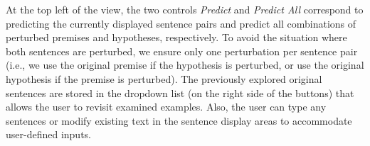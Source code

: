 At the top left of the view, the two controls \emph{Predict} and \emph{Predict All} correspond to predicting the currently displayed sentence pairs and predict all combinations of perturbed premises and hypotheses, respectively.
%
To avoid the situation where both sentences are perturbed, we ensure only one perturbation per sentence pair (i.e., we use the original premise if the hypothesis is perturbed, or use the original hypothesis if the premise is perturbed).
The previously explored original sentences are stored in the dropdown list (on the right side of the buttons) that allows the user to revisit examined examples.
Also, the user can type any sentences or modify existing text in the sentence display areas to accommodate user-defined inputs.




